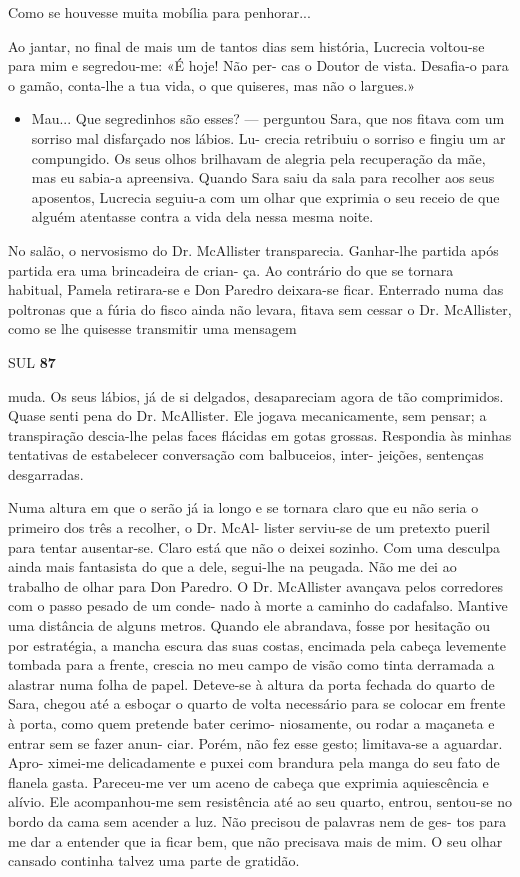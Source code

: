 Como se houvesse muita mobília para penhorar...

Ao jantar, no final de mais um de tantos dias sem história, Lucrecia
voltou-se para mim e segredou-me: «É hoje! Não per- cas o Doutor de
vista. Desafia-o para o gamão, conta-lhe a tua vida, o que quiseres, mas
não o largues.»

\begin{itemize}
\tightlist
\item
  Mau... Que segredinhos são esses? --- perguntou Sara, que nos fitava
  com um sorriso mal disfarçado nos lábios. Lu- crecia retribuiu o
  sorriso e fingiu um ar compungido. Os seus olhos brilhavam de alegria
  pela recuperação da mãe, mas eu sabia-a apreensiva. Quando Sara saiu
  da sala para recolher aos seus aposentos, Lucrecia seguiu-a com um
  olhar que exprimia o seu receio de que alguém atentasse contra a vida
  dela nessa mesma noite.
\end{itemize}

No salão, o nervosismo do Dr. McAllister transparecia. Ganhar-lhe
partida após partida era uma brincadeira de crian- ça. Ao contrário do
que se tornara habitual, Pamela retirara-se e Don Paredro deixara-se
ficar. Enterrado numa das poltronas que a fúria do fisco ainda não
levara, fitava sem cessar o Dr. McAllister, como se lhe quisesse
transmitir uma mensagem

SUL \textbf{87}

muda. Os seus lábios, já de si delgados, desapareciam agora de tão
comprimidos. Quase senti pena do Dr. McAllister. Ele jogava
mecanicamente, sem pensar; a transpiração descia-lhe pelas faces
flácidas em gotas grossas. Respondia às minhas tentativas de estabelecer
conversação com balbuceios, inter- jeições, sentenças desgarradas.

Numa altura em que o serão já ia longo e se tornara claro que eu não
seria o primeiro dos três a recolher, o Dr. McAl- lister serviu-se de um
pretexto pueril para tentar ausentar-se. Claro está que não o deixei
sozinho. Com uma desculpa ainda mais fantasista do que a dele, segui-lhe
na peugada. Não me dei ao trabalho de olhar para Don Paredro. O Dr.
McAllister avançava pelos corredores com o passo pesado de um conde-
nado à morte a caminho do cadafalso. Mantive uma distância de alguns
metros. Quando ele abrandava, fosse por hesitação ou por estratégia, a
mancha escura das suas costas, encimada pela cabeça levemente tombada
para a frente, crescia no meu campo de visão como tinta derramada a
alastrar numa folha de papel. Deteve-se à altura da porta fechada do
quarto de Sara, chegou até a esboçar o quarto de volta necessário para
se colocar em frente à porta, como quem pretende bater cerimo-
niosamente, ou rodar a maçaneta e entrar sem se fazer anun- ciar. Porém,
não fez esse gesto; limitava-se a aguardar. Apro- ximei-me delicadamente
e puxei com brandura pela manga do seu fato de flanela gasta. Pareceu-me
ver um aceno de cabeça que exprimia aquiescência e alívio. Ele
acompanhou-me sem resistência até ao seu quarto, entrou, sentou-se no
bordo da cama sem acender a luz. Não precisou de palavras nem de ges-
tos para me dar a entender que ia ficar bem, que não precisava mais de
mim. O seu olhar cansado continha talvez uma parte de gratidão.

